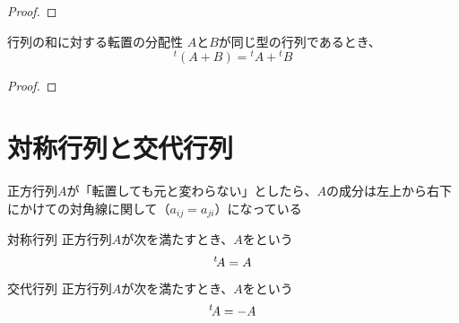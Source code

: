 \documentclass[../../../topic_linear-algebra]{subfiles}
\begin{document}
\begin{proof}
\end{proof}

\sectionline

\begin{theorem}{行列の和に対する転置の分配性}\label{thm:transpose-distributes-over-sum}
  $A$と$B$が同じ型の行列であるとき、
  \begin{equation*}
    {}^t(A + B) = {}^t A + {}^t B
  \end{equation*}
\end{theorem}

\begin{proof}
  \todo{}
\end{proof}

\sectionline
\section{対称行列と交代行列}

正方行列$A$が「転置しても元と変わらない」としたら、$A$の成分は左上から右下にかけての対角線に関して（$a_{ij} = a_{ji}$）になっている

\begin{definition}{対称行列}\label{def:symmetric-matrix}
  正方行列$A$が次を満たすとき、$A$をという
  \begin{equation*}
    {}^t\! A = A
  \end{equation*}
\end{definition}

\begin{definition}{交代行列}
  正方行列$A$が次を満たすとき、$A$をという
  \begin{equation*}
    {}^t\! A = -A
  \end{equation*}
\end{definition}
\end{document}
